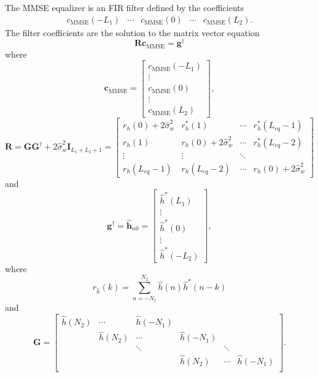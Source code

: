 The MMSE equalizer is an FIR filter defined by the coefficients
\begin{equation}
\begin{matrix}
c_\text{MMSE}(-L_1) & \cdots & c_\text{MMSE}(0) & \cdots & c_\text{MMSE}(L_2).
\end{matrix}
\end{equation}
The filter coefficients are the solution to the matrix vector equation \cite[eq. (330) and (333)]{PAQ-phase1}
\begin{equation}
\mathbf{R} \mathbf{c}_\text{MMSE} = \mathbf{g}^\dagger
\label{eq:start_here_MMSE}
\end{equation}
where
\begin{equation}
\mathbf{c}_\text{MMSE} = 
\begin{bmatrix}
c_\text{MMSE}(-L_1) \\ \vdots \\ c_\text{MMSE}(0) \\ \vdots \\ c_\text{MMSE}(L_2)
\end{bmatrix},
\end{equation}
\begin{equation}
\mathbf{R} = 
\mathbf{G}\mathbf{G}^\dagger + 2\hat{\sigma}^2_w \mathbf{I}_{L_1+L_2+1} = 
\begin{bmatrix}
r_{h}(0) + 2\hat{\sigma}^2_w	& r^\ast_{h}(1)							& \cdots 	& r^\ast_{h}(L_{eq}-1) 	\\
r_{h}(1) 						& r_{h}(0) + 2\hat{\sigma}^2_w& \cdots 	& r^\ast_{h}(L_{eq}-2)  			\\
\vdots	 						& \vdots								& \ddots 	&  						\\
r_{h}(L_{eq}-1)					& r_{h}(L_{eq}-2)						& \cdots	& r_{h}(0)+2\hat{\sigma}^2_w  
\end{bmatrix}
\label{eq:R}
\end{equation}
and
\begin{equation}
\mathbf{g}^\dagger = \hat{\mathbf{h}}_{n0} = \begin{bmatrix} \hat{h}^\ast(L_1) \\ \vdots \\ \hat{h}^\ast(0) \\ \vdots \\ \hat{h}^\ast(-L_2)  \end{bmatrix},
\label{eq:g_dagger_h_n0}
\end{equation}
where
\begin{equation}
r_{\hat{h}}(k) = \sum_{n=-N_1}^{N_2} \hat{h}(n) \hat{h}^\ast(n-k)
\label{eq:sample_autocorrelation_MMSE}
\end{equation}
and
\begin{equation}
\mathbf{G} = 
		\begin{bmatrix}
		\hat{h}(N_2)		& \cdots		& \hat{h}(-N_1) 	&  				  \\
							& \hat{h}(N_2)	& \cdots 			& \hat{h}(-N_1)	  \\
				 			& 				& \ddots 			&  				& \ddots	  \\
		 					&  	   			&  					& \hat{h}(N_2)	& \cdots	& \hat{h}(-N_1)	\\
	\end{bmatrix}.
\end{equation}

